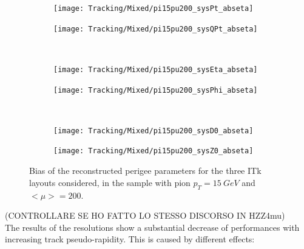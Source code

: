\documentclass[a4paper,twoside,12pt]{article}
\begin{document}
\begin{figure}
\begin{subfigure}{.5\linewidth}
\texttt{[image: Tracking/Mixed/pi15pu200\_sysPt\_abseta]}
\caption{}
\label{fig:tracking:pi15pu200_sysPt_abseta}
\end{subfigure}
\begin{subfigure}{.5\linewidth}
\texttt{[image: Tracking/Mixed/pi15pu200\_sysQPt\_abseta]}
\caption{}
\label{fig:tracking:pi15pu200_sysQPt_abseta}
\end{subfigure}\\[1ex]
\begin{subfigure}{.5\linewidth}
\texttt{[image: Tracking/Mixed/pi15pu200\_sysEta\_abseta]}
\caption{}
\label{fig:tracking:pi15pu200_sysEta_abseta}
\end{subfigure}
\begin{subfigure}{.5\linewidth}
\texttt{[image: Tracking/Mixed/pi15pu200\_sysPhi\_abseta]}
\caption{}
\label{fig:tracking:pi15pu200_sysPhi_abseta}
\end{subfigure}\\[1ex]
\begin{subfigure}{.5\linewidth}
\texttt{[image: Tracking/Mixed/pi15pu200\_sysD0\_abseta]}
\caption{}
\label{fig:tracking:pi15pu200_sysD0_abseta}
\end{subfigure}
\begin{subfigure}{.5\linewidth}
\texttt{[image: Tracking/Mixed/pi15pu200\_sysZ0\_abseta]}
\caption{}
\label{fig:tracking:pi15pu200_sysZ0_abseta}
\end{subfigure}
\caption{Bias of the reconstructed perigee parameters for the three ITk layouts considered, in the sample with pion $p_{T} = 15\ GeV$ and $<\mu> = 200$.}
\label{fig:tracking:pionBias}
\end{figure}

(CONTROLLARE SE HO FATTO LO STESSO DISCORSO IN HZZ4mu) \\
The results of the resolutions show a substantial decrease of performances with increasing track pseudo-rapidity. This is caused by different effects: 
\end{document}
